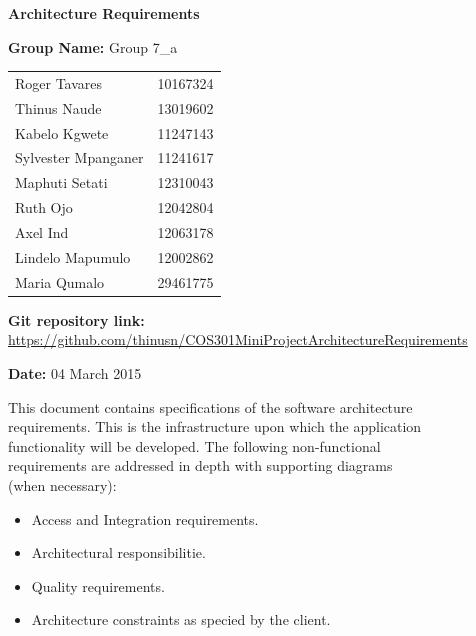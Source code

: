 \documentclass[a4paper,12pt]{article}
\begin{document}
\begin{center}

\Huge\textbf{Architecture Requirements\\}
																											
\vspace{2 cm}

\LARGE\textbf{Group Name:} Group 7\_a\newline
 
\vspace{0.5 cm}
\begin{tabular}{lr}
Roger Tavares&10167324\\
Thinus Naude&13019602 \\
Kabelo Kgwete&11247143\\
Sylvester Mpanganer&11241617\\
Maphuti Setati&12310043\\
Ruth Ojo&12042804\\
Axel Ind&12063178\\
Lindelo Mapumulo&12002862\\
Maria Qumalo&29461775\\
\end{tabular}

\vspace{1cm}
\textbf{Git repository link:\\}
\url{https://github.com/thinusn/COS301MiniProjectArchitectureRequirements}

\vspace{1cm}
\textbf{Date:} 04 March 2015
\end{center}

\newpage
\tableofcontents


\newpage
\setlength{\voffset}{-3cm}
This document contains specifications of the software architecture 
\\requirements. This is the infrastructure upon which the application
\\ functionality will be developed. The following non-functional
\\ requirements are addressed in depth with supporting diagrams
\\(when necessary):

\begin{itemize}
	\item Access and Integration requirements.
	\item Architectural responsibilitie.
	\item Quality requirements.
	\item Architecture constraints as specied by the client. 
\end{itemize}
\end{document}
